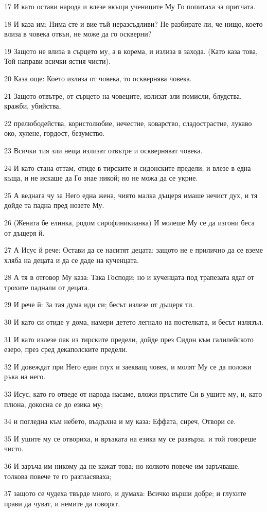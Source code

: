 \par 17 И като остави народа и влезе вкъщи учениците Му Го попитаха за притчата.
\par 18 И каза им: Нима сте и вие тъй неразсъдливи? Не разбирате ли, че нищо, което влиза в човека отвън, не може да го оскверни?
\par 19 Защото не влиза в сърцето му, а в корема, и излиза в захода. (Като каза това, Той направи всички ястия чисти).
\par 20 Каза още: Което излиза от човека, то осквернява човека.
\par 21 Защото отвътре, от сърцето на човеците, излизат зли помисли, блудства, кражби, убийства,
\par 22 прелюбодейства, користолюбие, нечестие, коварство, сладострастие, лукаво око, хулене, гордост, безумство.
\par 23 Всички тия зли неща излизат отвътре и оскверняват човека.
\par 24 И като стана оттам, отиде в тирските и сидонските предели; и влезе в една къща, и не искаше да Го знае никой; но не можа да се укрие.
\par 25 А веднага чу за Него една жена, чиято малка дъщеря имаше нечист дух, и тя дойде та падна пред нозете Му.
\par 26 (Жената бе елинка, родом сирофиникианка) И молеше Му се да изгони беса от дъщеря й.
\par 27 А Исус й рече: Остави да се наситят децата; защото не е прилично да се вземе хляба на децата и да се даде на кученцата.
\par 28 А тя в отговор Му каза: Така Господи; но и кученцата под трапезата ядат от трохите паднали от децата.
\par 29 И рече й: 3а тая дума иди си; бесът излезе от дъщеря ти.
\par 30 И като си отиде у дома, намери детето легнало на постелката, и бесът излязъл.
\par 31 И като излезе пак из тирските предели, дойде през Сидон към галилейското езеро, през сред декаполските предели.
\par 32 И довеждат при Него един глух и заекващ човек, и молят Му се да положи ръка на него.
\par 33 Исус, като го отведе от народа насаме, вложи пръстите Си в ушите му, и, като плюна, докосна се до езика му;
\par 34 и погледна към небето, въздъхна и му каза: Еффата, сиреч, Отвори се.
\par 35 И ушите му се отвориха, и връзката на езика му се развърза, и той говореше чисто.
\par 36 И заръча им никому да не кажат това; но колкото повече им заръчваше, толкова повече те го разгласяваха;
\par 37 защото се чудеха твърде много, и думаха: Всичко върши добре; и глухите прави да чуват, и немите да говорят.

